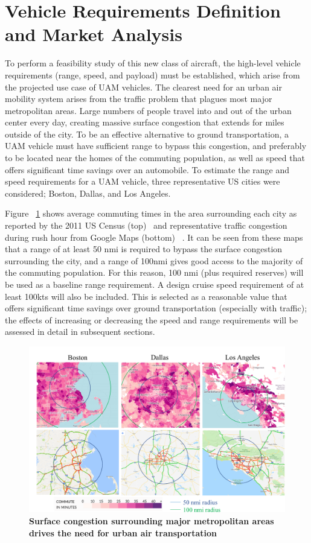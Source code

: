 \documentclass[]{aiaa-tc}%
\begin{document}
\section{Vehicle Requirements Definition and Market Analysis}
To perform a feasibility study of this new class of aircraft, the high-level vehicle requirements (range, speed, and payload) must be established, which arise from the projected use case of UAM vehicles.  The clearest need for an urban air mobility system arises from the traffic problem that plagues most major metropolitan areas.  Large numbers of people travel into and out of the urban center every day, creating massive surface congestion that extends for miles outside of the city.  To be an effective alternative to ground transportation, a UAM vehicle must have sufficient range to bypass this congestion, and preferably to be located near the homes of the commuting population, as well as speed that offers significant time savings over an automobile.  
To estimate the range and speed requirements for a UAM vehicle, three representative US cities were considered; Boston, Dallas, and Los Angeles.  

Figure ~\ref{f:commute} shows average commuting times in the area surrounding each city as reported by the 2011 US Census (top) ~\cite{WNYC}and representative traffic congestion during rush hour from Google Maps (bottom) ~\cite{google}.   It can be seen from these maps that a range of at least 50 nmi is required to bypass the surface congestion surrounding the city, and a range of 100nmi gives good access to the majority of the commuting population.   For this reason, 100 nmi (plus required reserves) will be used as a baseline range requirement.  A design cruise speed requirement of at least 100kts will also be included.  This is selected as a reasonable value that offers significant time savings over ground transportation (especially with traffic); the effects of increasing or decreasing the speed and range requirements will be assessed in detail in subsequent sections.  

\begin{figure}[h!]
	\begin{center}
	\includegraphics[width=1.0\textwidth]{commuting_need.pdf}
    \caption{\textbf{Surface congestion surrounding major metropolitan areas drives the need for urban air transportation}}
	\label{f:commute}
	\end{center}
\end{figure}
\end{document}
